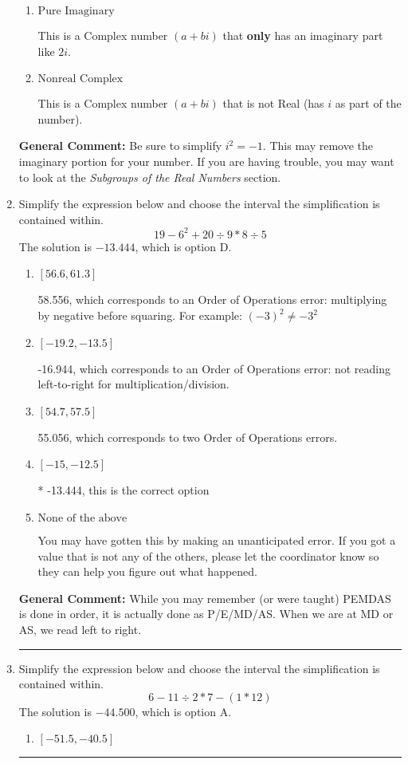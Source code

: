 \documentclass{extbook}[14pt]
\newcommand{\litem}[1]{\item #1

\rule{\textwidth}{0.4pt}}
\begin{document}
\begin{enumerate}
{\begin{enumerate}[label=\Alph*.]
* This is the correct option!
\item \( \text{Pure Imaginary} \)

This is a Complex number $(a+bi)$ that \textbf{only} has an imaginary part like $2i$.
\item \( \text{Nonreal Complex} \)

This is a Complex number $(a+bi)$ that is not Real (has $i$ as part of the number).
\end{enumerate}

\textbf{General Comment:} Be sure to simplify $i^2 = -1$. This may remove the imaginary portion for your number. If you are having trouble, you may want to look at the \textit{Subgroups of the Real Numbers} section.
}
\litem{
Simplify the expression below and choose the interval the simplification is contained within.
\[ 19 - 6^2 + 20 \div 9 * 8 \div 5 \]The solution is \( -13.444 \), which is option D.\begin{enumerate}[label=\Alph*.]
\item \( [56.6, 61.3] \)

 58.556, which corresponds to an Order of Operations error: multiplying by negative before squaring. For example: $(-3)^2 \neq -3^2$
\item \( [-19.2, -13.5] \)

 -16.944, which corresponds to an Order of Operations error: not reading left-to-right for multiplication/division.
\item \( [54.7, 57.5] \)

 55.056, which corresponds to two Order of Operations errors.
\item \( [-15, -12.5] \)

* -13.444, this is the correct option
\item \( \text{None of the above} \)

 You may have gotten this by making an unanticipated error. If you got a value that is not any of the others, please let the coordinator know so they can help you figure out what happened.
\end{enumerate}

\textbf{General Comment:} While you may remember (or were taught) PEMDAS is done in order, it is actually done as P/E/MD/AS. When we are at MD or AS, we read left to right.
}
\litem{
Simplify the expression below and choose the interval the simplification is contained within.
\[ 6 - 11 \div 2 * 7 - (1 * 12) \]The solution is \( -44.500 \), which is option A.\begin{enumerate}[label=\Alph*.]
\item \( [-51.5, -40.5] \)


\end{enumerate}}
\end{enumerate}
\end{document}
